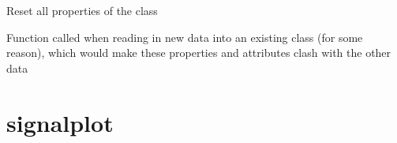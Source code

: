 \documentclass[letterpaper,10pt,english]{sphinxmanual}
\begin{document}
\begin{fulllineitems}
\begin{fulllineitems}
\begin{quote}
\begin{description}
\begin{itemize}
\end{itemize}

\end{description}\end{quote}

\end{fulllineitems}


\begin{fulllineitems}
\label{\detokenize{_autosummary/signalanalysis.vcg.Vcg:signalanalysis.vcg.Vcg.reset}}
\sphinxAtStartPar
Reset all properties of the class

\sphinxAtStartPar
Function called when reading in new data into an existing class (for some reason), which would make these
properties and attributes clash with the other data

\end{fulllineitems}


\end{fulllineitems}



\section{signalplot}
\label{\detokenize{_autosummary/signalplot:module-signalplot}}\label{\detokenize{_autosummary/signalplot:signalplot}}\label{\detokenize{_autosummary/signalplot::doc}}
\end{document}
